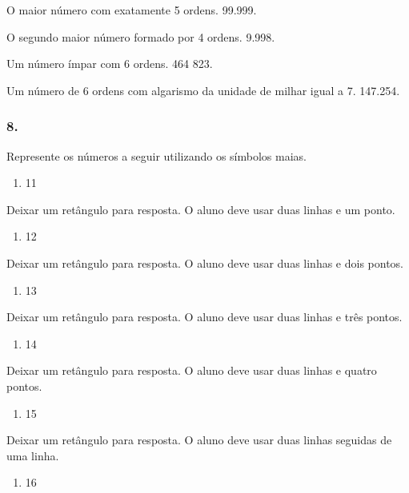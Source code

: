 \begin{enumerate}
O maior número com exatamente 5 ordens.
99.999.

O segundo maior número formado por 4 ordens.
9.998.

Um número ímpar com 6 ordens.
464 823.

Um número de 6 ordens com algarismo da unidade de milhar igual a 7.
147.254.


\subsubsection{8.}\label{section-7}

Represente os números a seguir utilizando os símbolos maias.

\begin{enumerate}
\def\labelenumi{\alph{enumi})}
\item
  11
\end{enumerate}

Deixar um retângulo para resposta.
O aluno deve usar duas linhas e um ponto.

\begin{enumerate}
\def\labelenumi{\alph{enumi})}
\item
  12
\end{enumerate}

Deixar um retângulo para resposta.
O aluno deve usar duas linhas e dois pontos.

\begin{enumerate}
\def\labelenumi{\alph{enumi})}
\item
  13
\end{enumerate}

Deixar um retângulo para resposta.
O aluno deve usar duas linhas e três pontos.

\begin{enumerate}
\def\labelenumi{\alph{enumi})}
\item
  14
\end{enumerate}

Deixar um retângulo para resposta.
O aluno deve usar duas linhas e quatro pontos.

\begin{enumerate}
\def\labelenumi{\alph{enumi})}
\item
  15
\end{enumerate}

Deixar um retângulo para resposta.
O aluno deve usar duas linhas seguidas de uma linha.

\begin{enumerate}
\def\labelenumi{\alph{enumi})}
\item
  16
\end{enumerate}


\end{enumerate}
